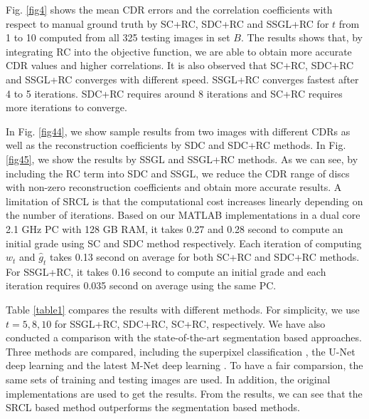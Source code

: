 \documentclass[journal]{IEEEtran}
\begin{document}
 Fig. \ref{fig4} shows the mean CDR errors and the correlation coefficients with respect to manual ground truth by  SC+RC, SDC+RC and SSGL+RC for $t$ from 1 to 10 computed from all 325 testing images in set $B$. The results shows that, by integrating RC into the objective function, we are able to obtain more accurate CDR values and higher correlations.
 It is also observed that  SC+RC, SDC+RC and SSGL+RC converges with different speed. SSGL+RC converges fastest after 4 to 5 iterations. SDC+RC requires around 8 iterations and SC+RC requires more iterations to converge.

 In Fig. \ref{fig44}, we show   sample results from two images with different CDRs as well as the reconstruction coefficients by SDC and SDC+RC methods. In Fig. \ref{fig45}, we show the results by SSGL and SSGL+RC methods.  As we can see, by including the RC term into SDC and SSGL, we reduce the CDR range of discs with non-zero reconstruction coefficients and obtain more accurate results.    A limitation of SRCL is that the computational cost increases linearly depending on the number of iterations. Based on our MATLAB implementations in a
 dual core 2.1 GHz PC with 128 GB RAM, it takes 0.27 and
 0.28 second to compute an initial grade using SC and SDC
 method respectively. Each iteration of computing $w_t$ and $\hat{g}_t$
 takes 0.13 second on average for both SC+RC and SDC+RC
 methods. For SSGL+RC, it takes 0.16 second to compute
 an initial grade and each iteration requires 0.035 second on
 average using the same PC.

  Table \ref{table1} compares the results with different methods. For simplicity, we use $t=5, 8, 10$ for SSGL+RC, SDC+RC, SC+RC, respectively.  We have also conducted a comparison  with the state-of-the-art segmentation based approaches. Three methods are compared, including the superpixel classification \cite{tmi2013}, the U-Net deep learning \cite{Ronneberger2015} and the latest M-Net deep learning \cite{huazhu18}. To have a fair comparsion, the same sets of
  training and testing images are used. In addition, the original
  implementations are used to get the results. From the results, we can see that the SRCL based method outperforms the segmentation based methods.
\end{document}
